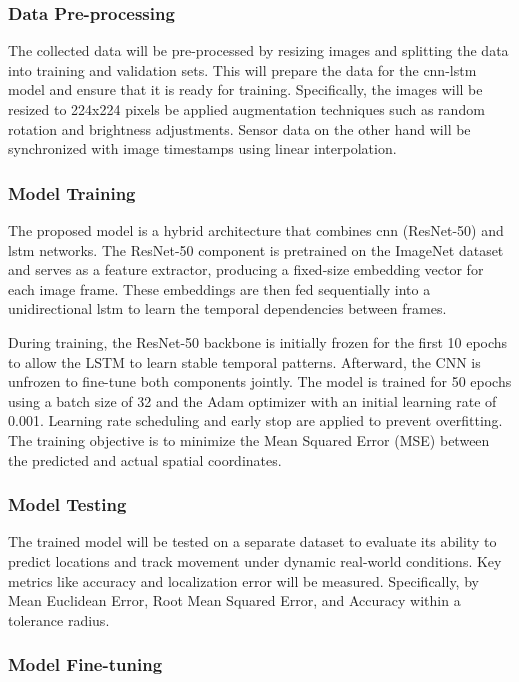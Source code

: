\begin{refsection}
\subsubsection{Data Pre-processing}

The collected data will be pre-processed by resizing images and splitting the data into training and validation sets. This will prepare the data for the \gls{cnn}-\gls{lstm} model and ensure that it is ready for training. Specifically, the images will be resized to 224x224 pixels be applied augmentation techniques such as random rotation and brightness adjustments. Sensor data on the other hand will be synchronized with image timestamps using linear interpolation.

\subsubsection{Model Training}

The proposed model is a hybrid architecture that combines \gls{cnn} (ResNet-50) and \gls{lstm} networks. The ResNet-50 component is pretrained on the ImageNet dataset and serves as a feature extractor, producing a fixed-size embedding vector for each image frame. These embeddings are then fed sequentially into a unidirectional \gls{lstm} to learn the temporal dependencies between frames.

During training, the ResNet-50 backbone is initially frozen for the first 10 epochs to allow the LSTM to learn stable temporal patterns. Afterward, the CNN is unfrozen to fine-tune both components jointly. The model is trained for 50 epochs using a batch size of 32 and the Adam optimizer with an initial learning rate of 0.001. Learning rate scheduling and early stop are applied to prevent overfitting. The training objective is to minimize the Mean Squared Error (MSE) between the predicted and actual spatial coordinates.

\subsubsection{Model Testing}

The trained model will be tested on a separate dataset to evaluate its ability to predict locations and track movement under dynamic real-world conditions. Key metrics like accuracy and localization error will be measured. Specifically, by Mean Euclidean Error, Root Mean Squared Error, and Accuracy within a tolerance radius.

\subsubsection{Model Fine-tuning}


\end{refsection}
